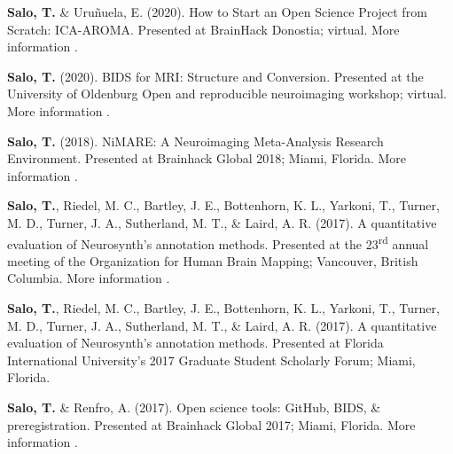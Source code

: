 \documentclass[10pt]{article}
\newcommand{\sectionstyle}{\LARGE \fontfamily{lmr}\selectfont}
\newcommand{\textlink}[3][blue]{\href{#2}{\color{#1}{#3}}}
\begin{document}
\bigskip

\begin{center}\sectionstyle{INVITED TALKS AND SOFTWARE DEMONSTRATIONS}\end{center}

\begin{hangparas}{.25in}{1}

    \textbf{Salo, T.} \& Uruñuela, E. (2020).
	How to Start an Open Science Project from Scratch: ICA-AROMA.
    Presented at BrainHack Donostia; virtual.
    More information
	\textlink{https://nbclab.github.io/presentations/salo-neurosynth-presentation}{here}.

	\bigskip

    \textbf{Salo, T.} (2020).
	BIDS for MRI: Structure and Conversion.
	Presented at the University of Oldenburg Open and reproducible neuroimaging workshop;
    virtual.
    More information \textlink{https://figshare.com/projects/BIDS_for_MRI_Structure_and_Conversion/92066}{here}.

\end{hangparas}

\bigskip

\begin{center}\sectionstyle{PRESENTATIONS}\end{center}

\begin{hangparas}{.25in}{1}

	\textbf{Salo, T.} (2018).
	NiMARE: A Neuroimaging Meta-Analysis Research Environment.
	Presented at Brainhack Global 2018; Miami, Florida. More
	information \textlink{https://www.slideshare.net/TaylorSalo/nimarebrainhackglobalmiami}{here}.

	\bigskip

	\textbf{Salo, T.}, Riedel, M. C., Bartley, J. E., Bottenhorn, K. L., Yarkoni, T.,
	Turner, M. D., Turner, J. A., Sutherland, M. T., \& Laird, A. R. (2017).
	A quantitative evaluation of Neurosynth's annotation methods. Presented at
	the 23\textsuperscript{rd} annual meeting of the Organization for Human Brain
	Mapping; Vancouver, British Columbia. More information
	\textlink{https://nbclab.github.io/presentations/salo-neurosynth-presentation}{here}.

	\bigskip

	\textbf{Salo, T.}, Riedel, M. C., Bartley, J. E., Bottenhorn, K. L., Yarkoni, T.,
	Turner, M. D., Turner, J. A., Sutherland, M. T., \& Laird, A. R. (2017).
	A quantitative evaluation of Neurosynth's annotation methods. Presented at
	Florida International University's 2017 Graduate Student Scholarly Forum;
	Miami, Florida.

	\bigskip

	\textbf{Salo, T.} \& Renfro, A. (2017). Open science tools: GitHub, BIDS, \&
	preregistration. Presented at Brainhack Global 2017; Miami, Florida. More
	information \textlink{https://osf.io/557vf}{here}.

\end{hangparas}
\end{document}
